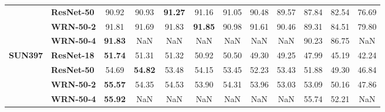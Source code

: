 \begin{table}
\begin{tabular}{l|l|cccccccccc}
       & \textbf{ResNet-50} &             90.92 & 90.93 & \textbf{91.27} & 91.16 & 91.05 & 90.48 & 89.57 & 87.84 & 82.54 & 76.69 \\
       & \textbf{WRN-50-2} &             91.81 & 91.69 & 91.83 & \textbf{91.85} & 90.98 & 91.61 & 90.46 & 89.31 & 84.51 & 79.80 \\
       & \textbf{WRN-50-4} &             \textbf{91.83} &   NaN &   NaN &   NaN &   NaN &   NaN &   NaN & 90.23 & 86.75 &   NaN \\
\cline{1-12}
\multirow{4}{*}{\textbf{SUN397}} & \textbf{ResNet-18} &             \textbf{51.74} & 51.31 & 51.32 & 50.92 & 50.50 & 49.30 & 49.25 & 47.99 & 45.19 & 42.24 \\
       & \textbf{ResNet-50} &             54.69 & \textbf{54.82} & 53.48 & 54.15 & 53.45 & 52.23 & 53.43 & 51.88 & 49.30 & 46.84 \\
       & \textbf{WRN-50-2} &             \textbf{55.57} & 54.35 & 54.53 & 53.90 & 54.31 & 53.96 & 53.03 & 53.09 & 50.16 & 47.86 \\
       & \textbf{WRN-50-4} &             \textbf{55.92} &   NaN &   NaN &   NaN &   NaN &   NaN &   NaN & 55.74 & 52.21 &   NaN \\
\bottomrule
\end{tabular}
\end{table}
